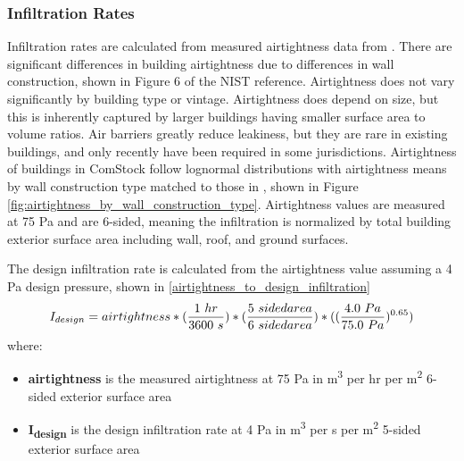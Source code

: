 \subsubsection{Infiltration Rates}
Infiltration rates are calculated from measured airtightness data from \citep{nist_infiltration_data}. There are significant differences in building airtightness due to differences in wall construction, shown in Figure 6 of the NIST reference. Airtightness does not vary significantly by building type or vintage. Airtightness does depend on size, but this is inherently captured by larger buildings having smaller surface area to volume ratios. Air barriers greatly reduce leakiness, but they are rare in existing buildings, and only recently have been required in some jurisdictions. Airtightness of buildings in ComStock follow lognormal distributions with airtightness means by wall construction type matched to those in \citep{nist_infiltration_data}, shown in Figure \ref{fig:airtightness_by_wall_construction_type}.
Airtightness values are measured at 75 Pa and are 6-sided, meaning the infiltration is normalized by total building exterior surface area including wall, roof, and ground surfaces.

The design infiltration rate is calculated from the airtightness value assuming a 4 Pa design pressure, shown in \ref{airtightness_to_design_infiltration}
\begin{align}
\label{airtightness_to_design_infiltration}
I_{design} = airtightness * ({1\ hr \over 3600\ s}) * ({5\ sided area \over 6\ sided area}) * (({4.0\ Pa \over 75.0\ Pa})\textsuperscript{0.65})
\end{align}
where:\\
\begin{itemize}
\item \textbf{airtightness} is the measured airtightness at 75 Pa in m\textsuperscript{3} per hr per m\textsuperscript{2} 6-sided exterior surface area\\
\item \textbf{I\textsubscript{design}} is the design infiltration rate at 4 Pa in m\textsuperscript{3} per s per m\textsuperscript{2} 5-sided exterior surface area\\
\end{itemize}


